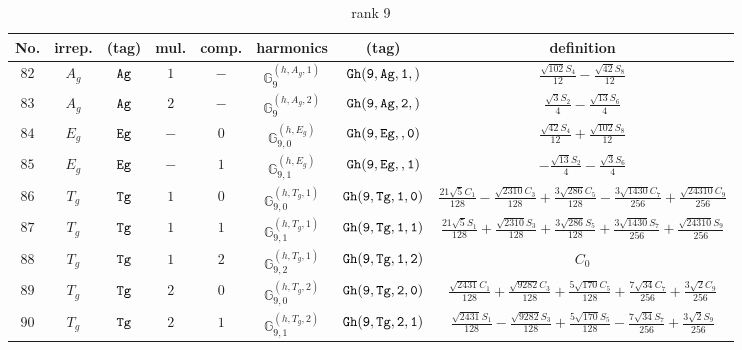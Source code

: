 \documentclass[fleqn,8pt]{jsarticle}
\begin{document}
\begin{table}[ht!]
\begin{center}
\caption{rank 9}
\renewcommand{\arraystretch}{1.3}
\begin{tabular}{cccccccc} \hline \hline
No. & irrep. & (tag) & mul. & comp. & harmonics & (tag) & definition \\ \hline
$ 82 $ & $ A_{g} $ & $ {\tt Ag} $ & $ 1 $ & $ - $ & $ \mathbb{G}_{9}^{(h,A_{g},1)} $ & $ {\tt Gh(9,Ag,1,)} $ & $ \frac{\sqrt{102} S_{4}}{12} - \frac{\sqrt{42} S_{8}}{12} $ \\
$ 83 $ & $ A_{g} $ & $ {\tt Ag} $ & $ 2 $ & $ - $ & $ \mathbb{G}_{9}^{(h,A_{g},2)} $ & $ {\tt Gh(9,Ag,2,)} $ & $ \frac{\sqrt{3} S_{2}}{4} - \frac{\sqrt{13} S_{6}}{4} $ \\
$ 84 $ & $ E_{g} $ & $ {\tt Eg} $ & $ - $ & $ 0 $ & $ \mathbb{G}_{9,0}^{(h,E_{g})} $ & $ {\tt Gh(9,Eg,,0)} $ & $ \frac{\sqrt{42} S_{4}}{12} + \frac{\sqrt{102} S_{8}}{12} $ \\
$ 85 $ & $ E_{g} $ & $ {\tt Eg} $ & $ - $ & $ 1 $ & $ \mathbb{G}_{9,1}^{(h,E_{g})} $ & $ {\tt Gh(9,Eg,,1)} $ & $ - \frac{\sqrt{13} S_{2}}{4} - \frac{\sqrt{3} S_{6}}{4} $ \\
$ 86 $ & $ T_{g} $ & $ {\tt Tg} $ & $ 1 $ & $ 0 $ & $ \mathbb{G}_{9,0}^{(h,T_{g},1)} $ & $ {\tt Gh(9,Tg,1,0)} $ & $ \frac{21 \sqrt{5} C_{1}}{128} - \frac{\sqrt{2310} C_{3}}{128} + \frac{3 \sqrt{286} C_{5}}{128} - \frac{3 \sqrt{1430} C_{7}}{256} + \frac{\sqrt{24310} C_{9}}{256} $ \\
$ 87 $ & $ T_{g} $ & $ {\tt Tg} $ & $ 1 $ & $ 1 $ & $ \mathbb{G}_{9,1}^{(h,T_{g},1)} $ & $ {\tt Gh(9,Tg,1,1)} $ & $ \frac{21 \sqrt{5} S_{1}}{128} + \frac{\sqrt{2310} S_{3}}{128} + \frac{3 \sqrt{286} S_{5}}{128} + \frac{3 \sqrt{1430} S_{7}}{256} + \frac{\sqrt{24310} S_{9}}{256} $ \\
$ 88 $ & $ T_{g} $ & $ {\tt Tg} $ & $ 1 $ & $ 2 $ & $ \mathbb{G}_{9,2}^{(h,T_{g},1)} $ & $ {\tt Gh(9,Tg,1,2)} $ & $ C_{0} $ \\
$ 89 $ & $ T_{g} $ & $ {\tt Tg} $ & $ 2 $ & $ 0 $ & $ \mathbb{G}_{9,0}^{(h,T_{g},2)} $ & $ {\tt Gh(9,Tg,2,0)} $ & $ \frac{\sqrt{2431} C_{1}}{128} + \frac{\sqrt{9282} C_{3}}{128} + \frac{5 \sqrt{170} C_{5}}{128} + \frac{7 \sqrt{34} C_{7}}{256} + \frac{3 \sqrt{2} C_{9}}{256} $ \\
$ 90 $ & $ T_{g} $ & $ {\tt Tg} $ & $ 2 $ & $ 1 $ & $ \mathbb{G}_{9,1}^{(h,T_{g},2)} $ & $ {\tt Gh(9,Tg,2,1)} $ & $ \frac{\sqrt{2431} S_{1}}{128} - \frac{\sqrt{9282} S_{3}}{128} + \frac{5 \sqrt{170} S_{5}}{128} - \frac{7 \sqrt{34} S_{7}}{256} + \frac{3 \sqrt{2} S_{9}}{256} $ \\

\end{tabular}
\end{center}
\end{table}
\end{document}
